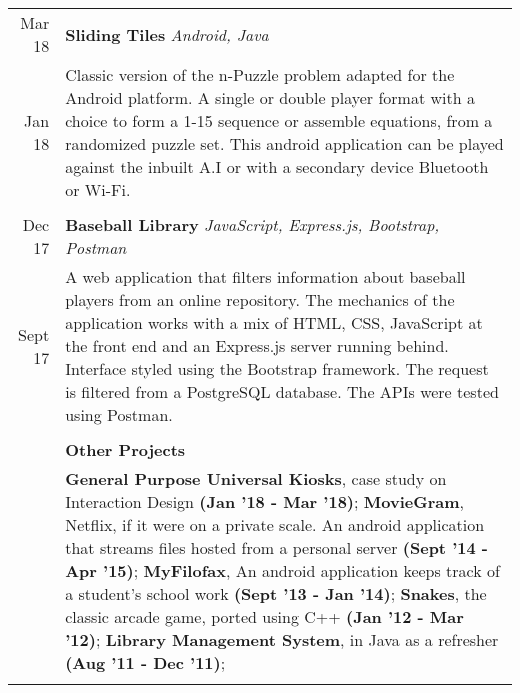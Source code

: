 \documentclass[article,10pt]{article}
\begin{document}
\begin{tabular}{r|p{16.75cm}}
Mar \textquotesingle{}18 & {\textbf{Sliding Tiles}} {\sl Android, Java}  \\
Jan \textquotesingle{}18 & \footnotesize{Classic version of the n-Puzzle problem adapted for the Android platform. A single or double player format with a choice to form a 1-15 sequence or assemble equations, from a randomized puzzle set. This android application can be played against the inbuilt A.I or with a secondary device Bluetooth or Wi-Fi.}\\ \multicolumn{2}{c}{} \\

Dec \textquotesingle{}17 & {\textbf{Baseball Library}} {\sl JavaScript, Express.js, Bootstrap, Postman}\\
Sept \textquotesingle{}17 & \footnotesize{A web application that filters information about baseball players from an online repository. The mechanics of the application works with a mix of HTML, CSS, JavaScript at the front end and an Express.js server running behind. Interface styled using the Bootstrap framework. The request is filtered from a PostgreSQL database. The API\textquotesingle{}s were tested using Postman.}\\ \multicolumn{2}{c}{}\\

&{\textbf{Other Projects}}\\
&\footnotesize{\textbf{General Purpose Universal Kiosks}, case study on Interaction Design \textbf{(Jan ’18 - Mar ’18)}; \textbf{MovieGram}, Netflix, if it were on a private scale. An android application that streams files hosted from a personal server \textbf{(Sept ’14 - Apr ’15)}; \textbf{MyFilofax}, An android application keeps track of a student’s school work \textbf{(Sept ’13 - Jan ’14)}; \textbf{Snakes}, the classic arcade game, ported using C++ \textbf{(Jan ’12 - Mar ’12)}; \textbf{Library Management System}, in Java as a refresher \textbf{(Aug ’11 - Dec ’11)}};\\\multicolumn{2}{c}{}\\
\end{tabular}
\end{document}
